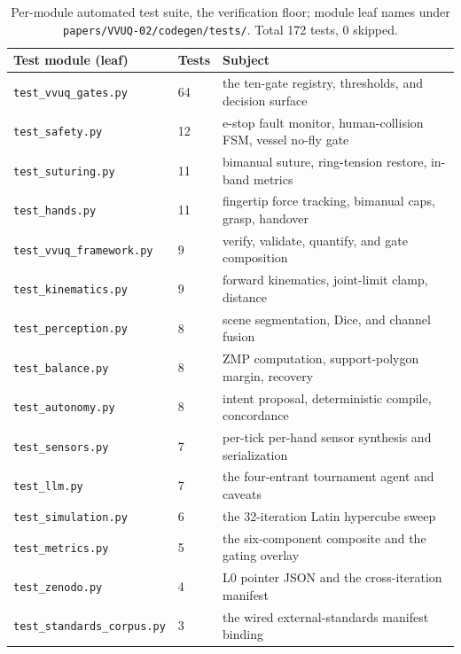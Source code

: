 \begin{table}[H]
\caption{Per-module automated test suite, the verification floor; module leaf
names under \texttt{papers/VVUQ-02/codegen/tests/}. Total 172 tests, 0 skipped.}
\label{tab:tests}
\centering
\footnotesize
\begin{tabularx}{\textwidth}{L{4.2cm} L{1.4cm} Y}
\toprule
\textbf{Test module (leaf)} & \textbf{Tests} & \textbf{Subject} \\
\midrule
\texttt{test\_vvuq\_gates.py} & 64 & the ten-gate registry, thresholds, and decision surface \\
\texttt{test\_safety.py} & 12 & e-stop fault monitor, human-collision FSM, vessel no-fly gate \\
\texttt{test\_suturing.py} & 11 & bimanual suture, ring-tension restore, in-band metrics \\
\texttt{test\_hands.py} & 11 & fingertip force tracking, bimanual caps, grasp, handover \\
\texttt{test\_vvuq\_framework.py} & 9 & verify, validate, quantify, and gate composition \\
\texttt{test\_kinematics.py} & 9 & forward kinematics, joint-limit clamp, distance \\
\texttt{test\_perception.py} & 8 & scene segmentation, Dice, and channel fusion \\
\texttt{test\_balance.py} & 8 & ZMP computation, support-polygon margin, recovery \\
\texttt{test\_autonomy.py} & 8 & intent proposal, deterministic compile, concordance \\
\texttt{test\_sensors.py} & 7 & per-tick per-hand sensor synthesis and serialization \\
\texttt{test\_llm.py} & 7 & the four-entrant tournament agent and caveats \\
\texttt{test\_simulation.py} & 6 & the 32-iteration Latin hypercube sweep \\
\texttt{test\_metrics.py} & 5 & the six-component composite and the gating overlay \\
\texttt{test\_zenodo.py} & 4 & L0 pointer JSON and the cross-iteration manifest \\
\texttt{test\_standards\_corpus.py} & 3 & the wired external-standards manifest binding \\
\bottomrule
\end{tabularx}
\end{table}

